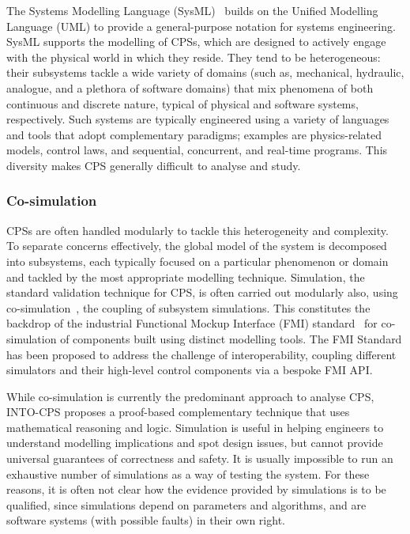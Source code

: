 The Systems Modelling Language (SysML)~\cite{OMGSysML2012} builds on the Unified Modelling Language (UML) to provide a general-purpose notation for systems engineering. SysML supports the modelling of CPSs, which are designed to actively engage with the physical world in which they reside. They tend to be heterogeneous: their subsystems tackle a wide variety of domains (such as, mechanical, hydraulic, analogue, and a plethora of software domains) that mix phenomena of both continuous and discrete nature, typical of physical and software systems, respectively. Such systems are typically engineered using a variety of languages and tools that adopt complementary paradigms; examples are physics-related models, control laws, and sequential, concurrent, and real-time programs. This diversity makes CPS generally difficult to analyse and study.

\subsubsection{Co-simulation}

CPSs are often handled modularly to tackle this heterogeneity and complexity. To separate concerns effectively, the global model of the system is decomposed into subsystems, each typically focused on a particular phenomenon or domain and tackled by the most appropriate modelling technique. Simulation, the standard validation technique for CPS, is often carried out modularly also, using co-simulation~\cite{GomesTBLV2017,Gomes&18}, the coupling of subsystem simulations. This constitutes the backdrop of the industrial Functional Mockup Interface (FMI) standard~\cite{FMIStandard2014,BromanBGLMTW2013,CavalcantiWA16} for co-simulation of components built using distinct modelling tools. The FMI Standard has been proposed to address the challenge of interoperability, coupling different simulators and their high-level control components via a bespoke FMI API.

While co-simulation is currently the predominant approach to analyse CPS, INTO-CPS proposes a proof-based complementary technique that uses mathematical reasoning and logic. Simulation is useful in helping engineers to understand modelling implications and spot design issues, but cannot provide universal guarantees of correctness and safety. It is usually impossible to run an exhaustive number of simulations as a way of testing the system. For these reasons, it is often not clear how the evidence provided by simulations is to be qualified, since simulations depend on parameters and algorithms, and are software systems (with possible faults) in their own right.

